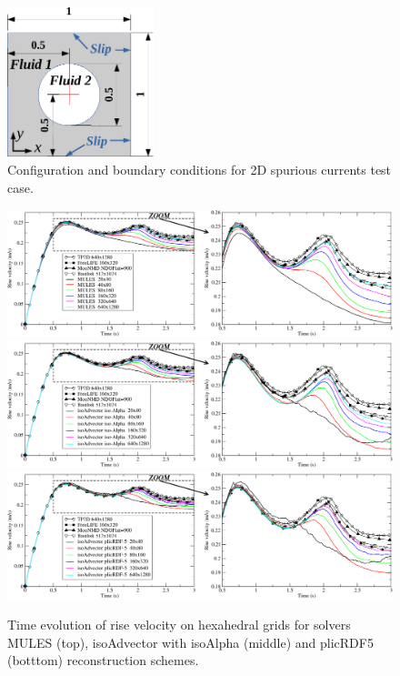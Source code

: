 \documentclass[review]{elsarticle}
\begin{document}
\begin{figure}[!h]
\begin{center}
 \vspace{-1mm}
 \includegraphics[width=4.25cm]{figures/spuriousCurrents_scheme.pdf}
 \vspace{-7mm}
\end{center}
\caption{Configuration and boundary conditions for 2D spurious currents test case.}
\label{fig:spuriousCurrents_scheme}
\end{figure}



\begin{figure}[!h]
\begin{center}
 \vspace{-1mm}
 \includegraphics[width=\textwidth]{figures/HysingB_bubble_velocity_MULES.pdf}
 \includegraphics[width=\textwidth]{figures/HysingB_bubble_velocity_isoAlpha.pdf}
 \includegraphics[width=\textwidth]{figures/HysingB_bubble_velocity_plicRDF5.pdf}
 \vspace{-14mm}
\end{center}
\caption{Time evolution of rise velocity on hexahedral grids for solvers MULES (top), isoAdvector with isoAlpha (middle) and plicRDF5 (botttom) reconstruction schemes.}
\label{fig:HB_Struct_bubble_velocity}
\end{figure}
\end{document}
